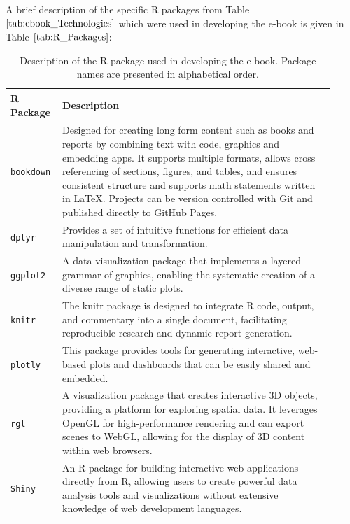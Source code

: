 \documentclass[11pt]{article}
\begin{document}
A brief description of the specific R packages from Table $\ref{tab:ebook_Technologies}$ which were used in developing the e-book is given in Table $\ref{tab:R_Packages}$:
\renewcommand\arraystretch{1.10}
\begin{table}[H]
\setlength{\belowcaptionskip}{-25pt}
\begin{center}
\begin{tabular}{| p{0.125\linewidth} | p{0.80\linewidth} |}
\hline
\textbf{R Package}	&	\textbf{Description}\\
\hline
\texttt{bookdown}	&	Designed for creating long form content such as books and reports by combining text with code, graphics and embedding apps. It supports multiple formats, allows cross referencing of sections, figures, and tables, and ensures consistent structure and supports math statements written in LaTeX. Projects can be version controlled with Git and published directly to GitHub Pages.\\
\hline
\texttt{dplyr}		&	Provides a set of intuitive functions for efficient data manipulation and transformation.\\
\hline
\texttt{ggplot2}		&	A data visualization package that implements a layered grammar of graphics, enabling the systematic creation of a diverse range of static plots.\\
\hline
\texttt{knitr}		&	The knitr package is designed to integrate R code, output, and commentary into a single document, facilitating reproducible research and dynamic report generation.\\
\hline
\texttt{plotly}		&	This package provides tools for generating interactive, web-based plots and dashboards that can be easily shared and embedded.\\
\hline
\texttt{rgl}			&	A visualization package that creates interactive 3D objects, providing a platform for exploring spatial data. It leverages OpenGL for high-performance rendering and can export scenes to WebGL, allowing for the display of 3D content within web browsers.\\
\hline
\texttt{Shiny}		&	An R package for building interactive web applications directly from R, allowing users to create powerful data analysis tools and visualizations without extensive knowledge of web development languages.\\
\hline
\end{tabular}
\caption{Description of the R package used in developing the e-book. Package names are presented in alphabetical order.}
\label{tab:R_Packages}
\end{center}
\end{table}
\end{document}
